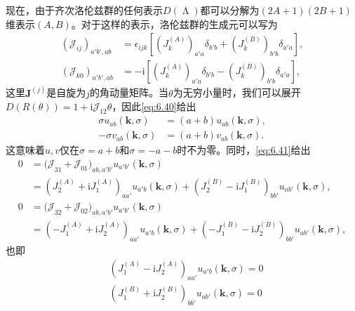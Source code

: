 现在，由于齐次洛伦兹群的任何表示$D( \upLambda )$都可以分解为$( 2A+1)( 2B+1)$维表示$( A,B)$。对于这样的表示，洛伦兹群的生成元可以写为
\begin{equation*}
	\begin{aligned}
		(\mathcal{J}_{ij})_{a'b',ab} & =\epsilon _{ijk} [(J_{k}^{( A)} )_{a'a} \delta _{b'b} +(J_{k}^{( B)} )_{b'b} \delta _{a'a} ],\\
		(\mathcal{J}_{k0})_{a'b',ab} & =-\mathrm{i} [(J_{k}^{( A)} )_{a'a} \delta _{b'b} -(J_{k}^{( B)} )_{b'b} \delta _{a'a} ],
	\end{aligned}
\end{equation*}
这里$\boldsymbol{J}^{( j)}$是自旋为$j$的角动量矩阵。当$\theta $为无穷小量时，我们可以展开$D( R( \theta )) =1+\mathrm{i}\mathcal{J}_{12} \theta $，因此\ref{eq:6.40}给出
\begin{equation*}
	\begin{aligned}
		\sigma u_{ab}(\boldsymbol{k} ,\sigma ) & =( a+b) u_{ab}(\boldsymbol{k} ,\sigma ) ,\\
		-\sigma v_{ab}(\boldsymbol{k} ,\sigma ) & =( a+b) v_{ab}(\boldsymbol{k} ,\sigma ) .
	\end{aligned}
\end{equation*}
这意味着$u,v$仅在$\sigma =a+b$和$\sigma =-a-b$时不为零。同时，\ref{eq:6.41}给出
\begin{equation*}
	\begin{aligned}
		0 & =\mathcal{(J}_{31} +\mathcal{J}_{01} )_{ab,a'b'} u_{a'b'} (\boldsymbol{k} ,\sigma )\\
		& =(J_{2}^{(A)} +\mathrm{i} J_{1}^{(A)} )_{aa'} u_{a'b} (\boldsymbol{k} ,\sigma )+(J_{2}^{(B)} -\mathrm{i} J_{1}^{(B)} )_{bb'} u_{ab'} (\boldsymbol{k} ,\sigma ),\\
		0 & =\mathcal{(J}_{32} +\mathcal{J}_{02} )_{ab,a'b'} u_{a'b'} (\boldsymbol{k} ,\sigma )\\
		& =(-J_{1}^{(A)} +\mathrm{i} J_{2}^{(A)} )_{aa'} u_{a'b} (\boldsymbol{k} ,\sigma )+(-J_{1}^{(B)} -\mathrm{i} J_{2}^{(B)} )_{bb'} u_{ab'} (\boldsymbol{k} ,\sigma ),
	\end{aligned}
\end{equation*}
也即
\begin{equation*}
	\begin{aligned}
		& (J_{1}^{(A)} -\mathrm{i} J_{2}^{(A)} )_{aa'} u_{a'b} (\boldsymbol{k} ,\sigma )=0\\
		& (J_{1}^{(B)} +\mathrm{i} J_{2}^{(B)} )_{bb'} u_{ab'} (\boldsymbol{k} ,\sigma )=0
	\end{aligned}
\end{equation*}
